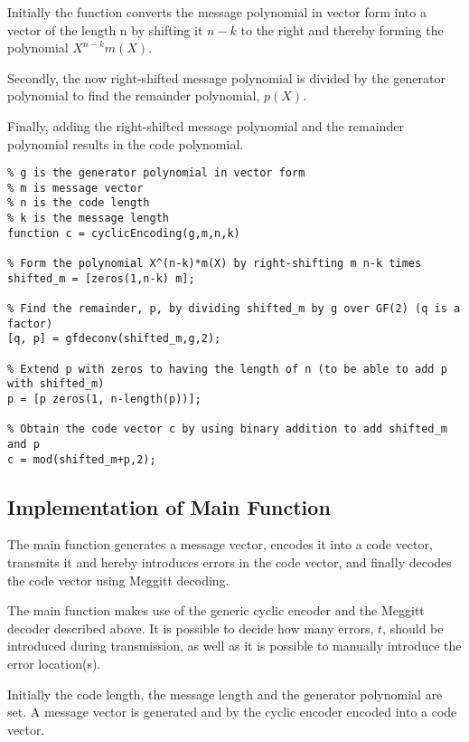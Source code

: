 \documentclass[Main]{subfiles}
\begin{document}
\noindent Initially the function converts the message polynomial in vector form into a vector of the length n by shifting it $n-k$ to the right and thereby forming the polynomial $X^{n-k}m(X)$. 

\noindent Secondly, the now right-shifted message polynomial is divided by the generator polynomial to find the remainder polynomial, $p(X)$.

\noindent Finally, adding the right-shifted message polynomial and the remainder polynomial results in the code polynomial.  

\begin{lstlisting}[caption=Cyclic Encoder, style=Code-Matlab, label=lst:refID]
% cyclicEncoding is a function that encodes a message vector into systematic code given the following parameters
% g is the generator polynomial in vector form
% m is message vector
% n is the code length
% k is the message length
function c = cyclicEncoding(g,m,n,k)

% Form the polynomial X^(n-k)*m(X) by right-shifting m n-k times 
shifted_m = [zeros(1,n-k) m];

% Find the remainder, p, by dividing shifted_m by g over GF(2) (q is a factor)
[q, p] = gfdeconv(shifted_m,g,2);

% Extend p with zeros to having the length of n (to be able to add p with shifted_m)
p = [p zeros(1, n-length(p))];

% Obtain the code vector c by using binary addition to add shifted_m and p 
c = mod(shifted_m+p,2);
\end{lstlisting}

\subsection{Implementation of Main Function}
The main function generates a message vector, encodes it into a code vector, transmits it and hereby introduces errors in the code vector, and finally decodes the code vector using Meggitt decoding.

\noindent The main function makes use of the generic cyclic encoder and the Meggitt decoder described above. It is possible to decide how many errors, $t$, should be introduced during transmission, as well as it is possible to manually introduce the error location(s).

\noindent Initially the code length, the message length and the generator polynomial are set. A message vector is generated and by the cyclic encoder encoded into a code vector. 
\end{document}
